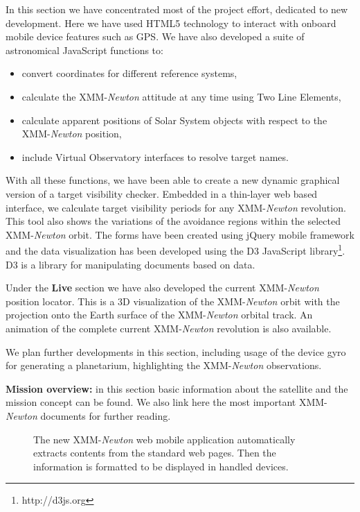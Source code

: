 In this section we have concentrated most of the project effort,
dedicated to new development. Here we have used HTML5 technology to
interact with onboard mobile device features such as GPS. We have also
developed a suite of astronomical JavaScript functions to:
\begin{itemize}
\item convert coordinates for different reference systems,
\item calculate the XMM-{\em Newton} attitude at any time using Two Line Elements,
\item calculate apparent positions of Solar System objects with respect to the XMM-{\em Newton} position,
\item include Virtual Observatory interfaces to resolve target names.
\end{itemize}

With all these functions, we have been able to create a new dynamic
graphical version of a target visibility checker. Embedded in a
thin-layer web based interface, we calculate target visibility periods
for any XMM-{\em Newton} revolution. This tool also shows the variations of the
avoidance regions within the selected XMM-{\em Newton} orbit. The forms have been
created using jQuery mobile framework and the data visualization has
been developed using the D3 JavaScript
library\footnote{http://d3js.org}. D3 is a library for manipulating
documents based on data. 

Under the {\bf Live} section we have also developed the current XMM-{\em Newton}
position locator. This is a 3D visualization of the XMM-{\em Newton} orbit with
the projection onto the Earth surface of the XMM-{\em Newton} orbital track. An
animation of the complete current XMM-{\em Newton} revolution is also available.

We plan further developments in this section, including usage of the
device gyro for generating a planetarium, highlighting the XMM-{\em Newton} observations.

{\bf Mission overview:} in this section basic information about the satellite and
the mission concept can be found. We also link here the
most important XMM-{\em Newton} documents for further reading. 

\begin{figure}[h]
\caption{ The new XMM-{\em Newton} web mobile application automatically extracts 
contents from the standard web pages. Then the information is formatted
to be displayed in handled devices.} \label{P061-fig-1}
\end{figure}


